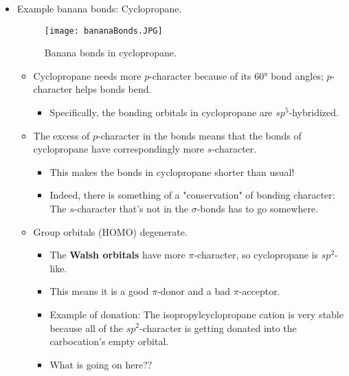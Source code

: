 \documentclass[../notes.tex]{subfiles}
\begin{document}
\begin{itemize}
    \begin{itemize}
        \item The bent $p$-lobes of banana bonds look like bananas (see Figure \ref{fig:bananaBonds}), hence the name.
    \end{itemize}
    \item Example banana bonds: Cyclopropane.
    \begin{figure}[h!]
        \centering
        \texttt{[image: bananaBonds.JPG]}
        \caption{Banana bonds in cyclopropane.}
        \label{fig:bananaBonds}
    \end{figure}
    \begin{itemize}
        \item Cyclopropane needs more $p$-character because of its \ang{60} bond angles; $p$-character helps bonds bend.
        \begin{itemize}
            \item Specifically, the  bonding orbitals in cyclopropane are $sp^5$-hybridized.
        \end{itemize}
        \item The excess of $p$-character in the  bonds means that the  bonds of cyclopropane have correspondingly more $s$-character.
        \begin{itemize}
            \item This makes the  bonds in cyclopropane shorter than usual!
            \item Indeed, there is something of a "conservation" of bonding character: The $s$-character that's not in the $\sigma$-bonds has to go somewhere.
        \end{itemize}
        \item Group orbitals (HOMO) degenerate.
        \begin{itemize}
            \item The \textbf{Walsh orbitals} have more $\pi$-character, so cyclopropane is $sp^2$-like.
            \item This means it is a good $\pi$-donor and a bad $\pi$-acceptor.
            \item Example of donation: The isopropylcyclopropane cation is very stable because all of the $sp^2$-character is getting donated into the carbocation's empty orbital.
            \item What is going on here??
        \end{itemize}
    \end{itemize}

\end{itemize}
\end{document}
